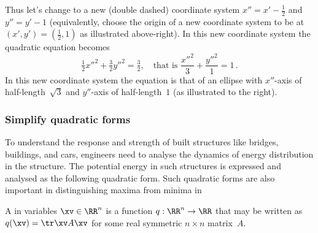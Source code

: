 \begin{example}
\begin{solution}
\begin{enumerate}
\begin{figbox}{}%
Thus let's change to a new (double dashed) coordinate system \(x''=x'-\tfrac12\) and \(y''=y'-1\) (equivalently, choose the origin of a new coordinate system to be at \((x',y')=(\tfrac12,1)\) as illustrated above-right).
In this new coordinate system the quadratic equation becomes
\begin{equation*}
\tfrac12{x''}^2+\tfrac32{y''}^2=\tfrac32,
\quad\text{that is } \frac{{x''}^2}3+\frac{{y''}^2}1=1\,.
\end{equation*}
In this new coordinate system the equation is that of an ellipse with \(x''\)-axis of half-length~\(\sqrt3\) and \(y''\)-axis of half-length~\(1\) (as illustrated to the right).
\aqed
\end{figbox}
\end{enumerate}
\end{solution}
\end{example}




\begin{comment}
Should include classification of 3D surfaces, but write later. 
Further motivate the following quadratic forms by mentioning some more applications.
\end{comment}






\subsubsection{Simplify quadratic forms}


To understand the response and strength of built structures like bridges, buildings, and cars, engineers need to analyse the dynamics of energy distribution in the structure.
The potential energy in such structures is expressed and analysed as the following quadratic form.
Such quadratic forms are also important in distinguishing maxima from minima in 

\begin{definition} \label{def:qufo}
A  in variables \(\xv\in\RR^n\) is a function \(q:\RR^n\to\RR\) that may be written as \(q(\xv)=\tr\xv A\xv\) for some real symmetric \(n\times n\) matrix~\(A\).
\end{definition}

